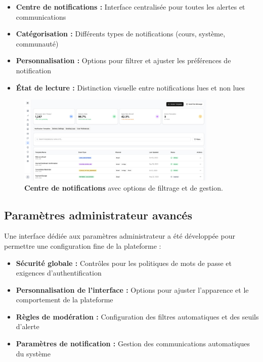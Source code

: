 \begin{itemize}
  \item \textbf{Centre de notifications :} Interface centralisée pour toutes les alertes et communications
  \item \textbf{Catégorisation :} Différents types de notifications (cours, système, communauté)
  \item \textbf{Personnalisation :} Options pour filtrer et ajuster les préférences de notification
  \item \textbf{État de lecture :} Distinction visuelle entre notifications lues et non lues
\end{itemize}

\begin{figure}[H]
  \centering
  \includegraphics[width=0.85\textwidth,keepaspectratio]{old-reports/week_4_img/notifi.jpeg}
  \caption{\textbf{Centre de notifications} avec options de filtrage et de gestion.}
  \label{fig:notification_center}
\end{figure}

\subsection{Paramètres administrateur avancés}

Une interface dédiée aux paramètres administrateur a été développée pour permettre une configuration fine de la plateforme :

\begin{itemize}
  \item \textbf{Sécurité globale :} Contrôles pour les politiques de mots de passe et exigences d'authentification
  \item \textbf{Personnalisation de l'interface :} Options pour ajuster l'apparence et le comportement de la plateforme
  \item \textbf{Règles de modération :} Configuration des filtres automatiques et des seuils d'alerte
  \item \textbf{Paramètres de notification :} Gestion des communications automatiques du système
\end{itemize}


